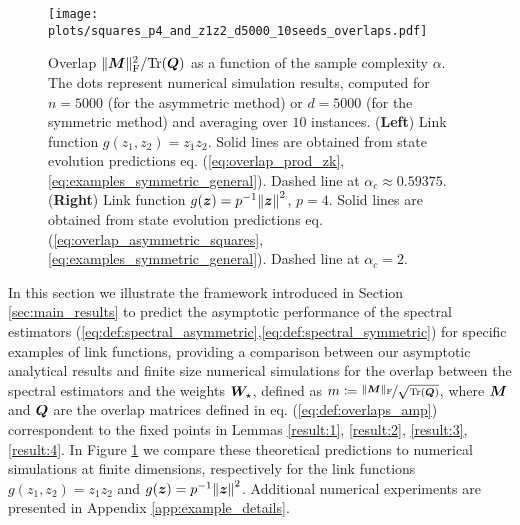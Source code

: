 
\begin{figure*}[ht!]
    \centering
    \texttt{[image: plots/squares\_p4\_and\_z1z2\_d5000\_10seeds\_overlaps.pdf]}
    \caption{Overlap $ \|{\boldsymbol M} \|_{\mathrm{F}} ^2 / {\rm Tr}({\boldsymbol Q})$ as a function of the sample complexity $\alpha$. The dots represent numerical simulation results, computed for $n = 5000$ (for the asymmetric method) or $d = 5000$ (for the symmetric method) and averaging over $10$ instances. (\textbf{Left}) Link function $g(z_1,z_2) = z_1z_2$. Solid lines are obtained from state evolution predictions eq. (\ref{eq:overlap_prod_zk},\ref{eq:examples_symmetric_general}). Dashed line at $\alpha_c \approx 0.59375$. (\textbf{Right}) Link function $g({\boldsymbol z}) = p^{-1}\norm{{\boldsymbol z}}^2$, $p = 4$. Solid lines are obtained from state evolution predictions eq. (\ref{eq:overlap_asymmetric_squares},\ref{eq:examples_symmetric_general}). Dashed line at $\alpha_c = 2$.}
    \label{fig:z1z2_overlap}
\end{figure*}
In this section we illustrate the framework introduced in Section \ref{sec:main_results} to predict the asymptotic performance of the spectral estimators (\ref{eq:def:spectral_asymmetric},\ref{eq:def:spectral_symmetric}) for specific examples of link functions, providing a comparison between our asymptotic analytical results and finite size numerical simulations for the overlap between the spectral estimators and the weights $\bm{W}_\star$, defined as $m \coloneqq \nicefrac{ \|{\boldsymbol M} \|_{\mathrm{F}} }{\sqrt{{\rm Tr}({\boldsymbol Q})}}$, where ${\boldsymbol M}$ and ${\boldsymbol Q}$ are the overlap matrices defined in eq. (\ref{eq:def:overlaps_amp}) correspondent to the fixed points in Lemmas \ref{result:1}, \ref{result:2}, \ref{result:3}, \ref{result:4}. In Figure \ref{fig:z1z2_overlap} we compare these theoretical predictions to numerical simulations at finite dimensions, respectively for the link functions $g(z_1,z_2) = z_1z_2$ and $g({\boldsymbol z}) = p^{-1}\norm{{\boldsymbol z}}^2$. Additional numerical experiments are presented in Appendix \ref{app:example_details}.
